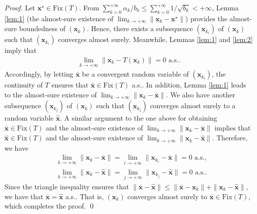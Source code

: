 \documentclass[smallextended,referee,envcountsect,]{svjour3}
\begin{document}
\begin{proof}
Let $\bm{x}^\star \in \mathrm{Fix}(T)$. From $\sum_{k=0}^{+ \infty} \alpha_k/b_k \leq \sum_{k=0}^{+ \infty} 1/\sqrt{b_k} < + \infty$, Lemma \ref{lem:1} (the almost-sure existence of $\lim_{k \to + \infty} \|\bm{x}_k - \bm{x}^\star\|$) provides the almost-sure boundedness of $(\bm{x}_k)$. Hence, there exists a subsequence $(\bm{x}_{k_i})$ of $(\bm{x}_k)$ such that $(\bm{x}_{k_i})$ converges almost surely. Meanwhile, Lemmas \ref{lem:1} and \ref{lem:2} imply that 
\begin{align*}
\lim_{k \to + \infty} \|\bm{x}_k - T (\bm{x}_k)\| = 0 \text{ a.s.}. 
\end{align*}
Accordingly, by letting $\bar{\bm{x}}$ be a convergent random variable of $(\bm{x}_{k_i})$, the continuity of $T$ ensures that $\bar{\bm{x}} \in \mathrm{Fix}(T)$ a.s.. In addition, Lemma \ref{lem:1} leads to the almost-sure existence of $\lim_{k \to + \infty} \|\bm{x}_k - \bar{\bm{x}}\|$. We also have another subsequence $(\bm{x}_{k_j})$ of $(\bm{x}_k)$ such that $(\bm{x}_{k_j})$ converges almost surely to a random variable $\hat{\bm{x}}$. A similar argument to the one above for obtaining $\bar{\bm{x}} \in \mathrm{Fix}(T)$ and the almost-sure existence of $\lim_{k \to + \infty} \|\bm{x}_k - \bar{\bm{x}}\|$ implies that $\hat{\bm{x}} \in \mathrm{Fix}(T)$ and the almost-sure existence of $\lim_{k \to + \infty} \|\bm{x}_k - \hat{\bm{x}}\|$. Therefore, we have 
\begin{align*}
&\lim_{k \to + \infty} \| \bm{x}_k - \bar{\bm{x}} \| = \lim_{i \to + \infty} \|\bm{x}_{k_i} - \bar{\bm{x}}\| = 0 \text{ a.s.},\\ 
&\lim_{k \to + \infty} \| \bm{x}_k - \hat{\bm{x}} \| = \lim_{j \to + \infty} \|\bm{x}_{k_j} - \hat{\bm{x}}\| = 0 \text{ a.s.}.
\end{align*}
Since the triangle inequality ensures that $\| \bar{\bm{x}} - \hat{\bm{x}} \| \leq \| \bar{\bm{x}} - \bm{x}_k \| + \| \bm{x}_k - \hat{\bm{x}} \|$, we have that $\bar{\bm{x}} = \hat{\bm{x}}$ a.s.. That is, $(\bm{x}_k)$ converges almost surely to $\bar{\bm{x}} \in \mathrm{Fix}(T)$, which completes the proof. 
\qed
\end{proof}
\end{document}
